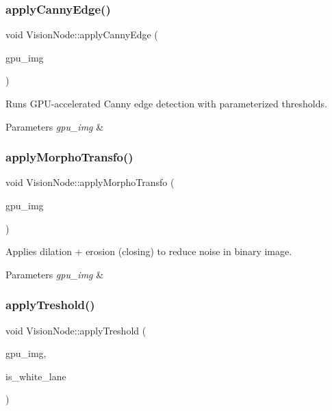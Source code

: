 \subsubsection{\texorpdfstring{apply\+Canny\+Edge()}{applyCannyEdge()}}
{\footnotesize\ttfamily void Vision\+Node\+::apply\+Canny\+Edge (\begin{DoxyParamCaption}\item[{cv\+::cuda\+::\+Gpu\+Mat \&}]{gpu\+\_\+img }\end{DoxyParamCaption})\hspace{0.3cm}{\ttfamily [private]}}



Runs G\+P\+U-\/accelerated Canny edge detection with parameterized thresholds. 


\begin{DoxyParams}{Parameters}
{\em gpu\+\_\+img} & \\
\hline
\end{DoxyParams}
\mbox{\label{classVisionNode_a6a6385ceaa4a9bb1e3d50dd2e55fb071}} 
\subsubsection{\texorpdfstring{apply\+Morpho\+Transfo()}{applyMorphoTransfo()}}
{\footnotesize\ttfamily void Vision\+Node\+::apply\+Morpho\+Transfo (\begin{DoxyParamCaption}\item[{cv\+::cuda\+::\+Gpu\+Mat \&}]{gpu\+\_\+img }\end{DoxyParamCaption})\hspace{0.3cm}{\ttfamily [private]}}



Applies dilation + erosion (closing) to reduce noise in binary image. 


\begin{DoxyParams}{Parameters}
{\em gpu\+\_\+img} & \\
\hline
\end{DoxyParams}
\mbox{\label{classVisionNode_a234d00d510249ff752af20a64b8618bd}} 
\subsubsection{\texorpdfstring{apply\+Treshold()}{applyTreshold()}}
{\footnotesize\ttfamily void Vision\+Node\+::apply\+Treshold (\begin{DoxyParamCaption}\item[{cv\+::cuda\+::\+Gpu\+Mat \&}]{gpu\+\_\+img,  }\item[{bool}]{is\+\_\+white\+\_\+lane }\end{DoxyParamCaption})\hspace{0.3cm}{\ttfamily [private]}}



